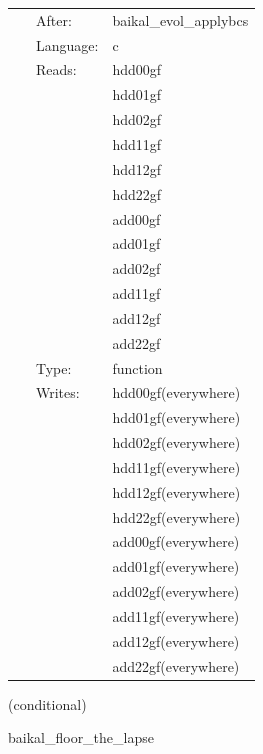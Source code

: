 \hspace{5mm}{\it project every updated bssn/fccz4 state before its next rhs } 


\hspace{5mm}

 \begin{tabular*}{160mm}{cll} 
~ & After:  & baikal\_evol\_applybcs \\ 
~ & Language:  & c \\ 
~ & Reads:  & hdd00gf \\ 
~& ~ &hdd01gf\\ 
~& ~ &hdd02gf\\ 
~& ~ &hdd11gf\\ 
~& ~ &hdd12gf\\ 
~& ~ &hdd22gf\\ 
~& ~ &add00gf\\ 
~& ~ &add01gf\\ 
~& ~ &add02gf\\ 
~& ~ &add11gf\\ 
~& ~ &add12gf\\ 
~& ~ &add22gf\\ 
~ & Type:  & function \\ 
~ & Writes:  & hdd00gf(everywhere) \\ 
~& ~ &hdd01gf(everywhere)\\ 
~& ~ &hdd02gf(everywhere)\\ 
~& ~ &hdd11gf(everywhere)\\ 
~& ~ &hdd12gf(everywhere)\\ 
~& ~ &hdd22gf(everywhere)\\ 
~& ~ &add00gf(everywhere)\\ 
~& ~ &add01gf(everywhere)\\ 
~& ~ &add02gf(everywhere)\\ 
~& ~ &add11gf(everywhere)\\ 
~& ~ &add12gf(everywhere)\\ 
~& ~ &add22gf(everywhere)\\ 
\end{tabular*} 


\vspace{5mm}

   (conditional) 

\hspace{5mm} baikal\_floor\_the\_lapse 

\hspace{5mm}{\it set lapse = max(lapse\_floor, lapse) } 


